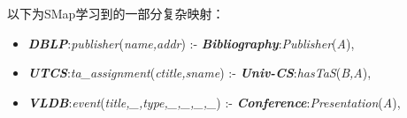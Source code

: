 以下为SMap学习到的一部分复杂映射：
\begin{itemize}
\item{
\textbf{\emph{DBLP}}:\emph{publisher}(\emph{name,addr}) :-
\textbf{\emph{Bibliography}}:\emph{Publisher}(\emph{A}),
}
\item{
\textbf{\emph{UTCS}}:\emph{ta\_assignment}(\emph{ctitle,sname}) :-
\textbf{\emph{Univ-CS}}:\emph{hasTaS}(\emph{B,A}),
}
\item{
\textbf{\emph{VLDB}}:\emph{event}(\emph{title,\_,type,\_,\_,\_,\_}) :-
\textbf{\emph{Conference}}:\emph{Presentation}(\emph{A}),
}
\end{itemize}



